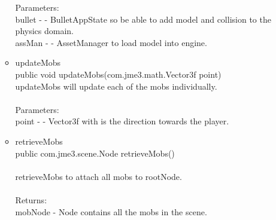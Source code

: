 \documentclass[letterpaper]{article}
\begin{document}
\begin{itemize}
\begin{itemize}
											Parameters: \\
											bullet - - BulletAppState so be able to add model and collision to the physics domain. \\
											assMan - - AssetManager to load model into engine.
									\item	updateMobs \\
											public void updateMobs(com.jme3.math.Vector3f point) \\
											updateMobs will update each of the mobs individually. \\ \\
											Parameters: \\
											point - - Vector3f with is the direction towards the player.
									\item	retrieveMobs \\
											public com.jme3.scene.Node retrieveMobs() \\ \\
											retrieveMobs to attach all mobs to rootNode. \\ \\
											Returns: \\
											mobNode - Node contains all the mobs in the scene.
								\end{itemize}
					\end{itemize}
				
				\vspace{0.2in}
\end{document}
